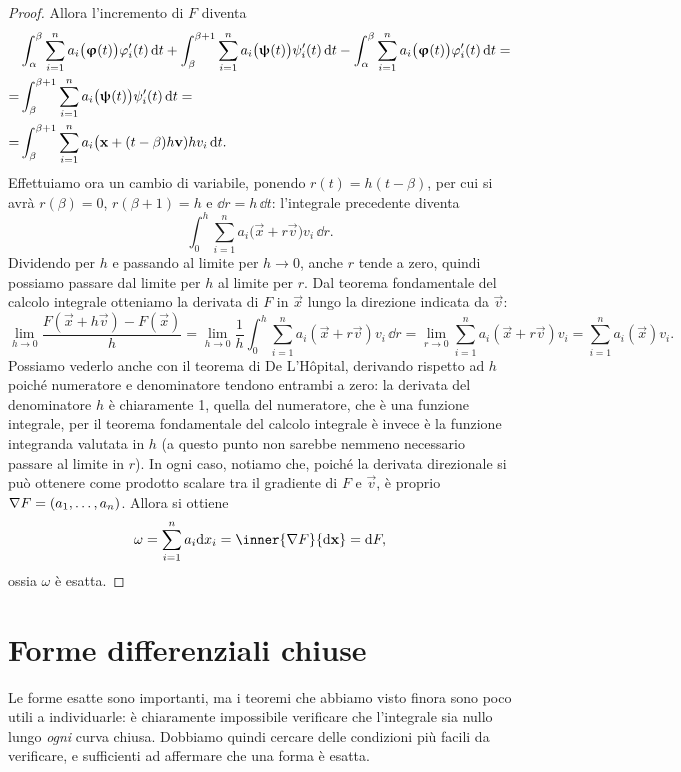 \begin{proof}
	Allora l'incremento di $F$ diventa
	\begin{equation}
		\begin{aligned}
			&\int_\alpha^\beta\sum_{i=1}^na_i\big(\bm{\upvarphi}(t)\big)\varphi_i'(t)\,\textup{d} t+\int_\beta^{\beta+1}\sum_{i=1}^na_i\big(\bm{\uppsi}(t)\big)\psi_i'(t)\,\textup{d} t-\int_\alpha^\beta\sum_{i=1}^na_i\big(\bm{\upvarphi}(t)\big)\varphi_i'(t)\,\textup{d} t=\\
			=&\int_\beta^{\beta+1}\sum_{i=1}^na_i\big(\bm{\uppsi}(t)\big)\psi_i'(t)\,\textup{d} t=\\
			=&\int_\beta^{\beta+1}\sum_{i=1}^na_i\big(\mathbf{x}+(t-\beta)h\mathbf{v})hv_i\,\textup{d} t.
		\end{aligned}
	\end{equation}
	Effettuiamo ora un cambio di variabile, ponendo $r(t)=h(t-\beta)$, per cui si avrà $r(\beta)=0$, $r(\beta+1)=h$ e $\dd r=h\,\dd t$: l'integrale precedente diventa
	\begin{equation}
		\int_0^h\sum_{i=1}^na_i\big(\vec x+r\vec v)v_i\,\dd r.
	\end{equation}
	Dividendo per $h$ e passando al limite per $h\to0$, anche $r$ tende a zero, quindi possiamo passare dal limite per $h$ al limite per $r$.
	Dal teorema fondamentale del calcolo integrale otteniamo la derivata di $F$ in $\vec x$ lungo la direzione indicata da $\vec v$:
	\begin{equation}
		\lim_{h\to0}\frac{F(\vec x+h\vec v)-F(\vec x)}{h}=\lim_{h\to0}\frac1{h}\int_0^h\sum_{i=1}^na_i(\vec x+r\vec v)v_i\,\dd r=\lim_{r\to 0}\sum_{i=1}^na_i(\vec x+r\vec v)v_i=\sum_{i=1}^na_i(\vec x)v_i.
	\end{equation}
	Possiamo vederlo anche con il teorema di De L'H\^opital, derivando rispetto ad $h$ poich\'e numeratore e denominatore tendono entrambi a zero: la derivata del denominatore $h$ è chiaramente 1, quella del numeratore, che è una funzione integrale, per il teorema fondamentale del calcolo integrale è invece è la funzione integranda valutata in $h$ (a questo punto non sarebbe nemmeno necessario passare al limite in $r$).
	In ogni caso, notiamo che, poiché la derivata direzionale si può ottenere come prodotto scalare tra il gradiente di $F$ e $\vec v$, è proprio $\nabla F=(a_1,\dots,a_n)$.
	Allora si ottiene
	\begin{equation}
		\omega=\sum_{i=1}^na_i\dd x_i=\inner{\grad F}{\dd\vec x}=\dd F,
	\end{equation}
	ossia $\omega$ è esatta.
\end{proof}

\section{Forme differenziali chiuse}
Le forme esatte sono importanti, ma i teoremi che abbiamo visto finora sono poco utili a individuarle: è chiaramente impossibile verificare che l'integrale sia nullo lungo \emph{ogni} curva chiusa.
Dobbiamo quindi cercare delle condizioni più facili da verificare, e sufficienti ad affermare che una forma è esatta.

